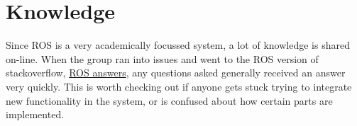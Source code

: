 \section{Knowledge}
Since ROS is a very academically focussed system, a lot of knowledge is shared on-line.
When the group ran into issues and went to the ROS version of stackoverflow, \href{https://answers.ros.org/questions/}{ROS answers}, any questions asked generally received an answer very quickly.
This is worth checking out if anyone gets stuck trying to integrate new functionality in the system, or is confused about how certain parts are implemented.

